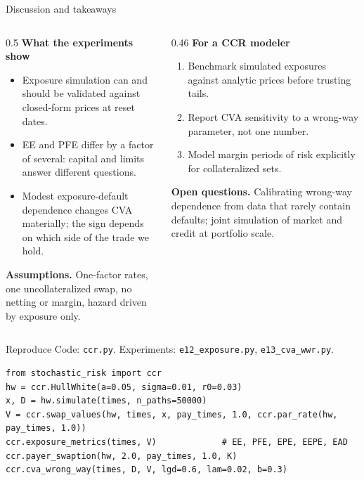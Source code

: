 \documentclass[aspectratio=169,10pt]{beamer}
\begin{document}
\begin{frame}{Discussion and takeaways}
  \small
  \begin{columns}[T]
    \begin{column}{0.5\textwidth}
      \textbf{What the experiments show}
      \begin{itemize}
        \item Exposure simulation can and should be validated against closed-form prices at reset dates.
        \item EE and PFE differ by a factor of several: capital and limits answer different questions.
        \item Modest exposure-default dependence changes CVA materially; the sign depends on which side of the trade we hold.
      \end{itemize}
      \textbf{Assumptions.} One-factor rates, one uncollateralized swap, no netting or margin, hazard driven by exposure only.
    \end{column}
    \begin{column}{0.46\textwidth}
      \textbf{For a CCR modeler}
      \begin{enumerate}
        \item Benchmark simulated exposures against analytic prices before trusting tails.
        \item Report CVA sensitivity to a wrong-way parameter, not one number.
        \item Model margin periods of risk explicitly for collateralized sets.
      \end{enumerate}
      \textbf{Open questions.} Calibrating wrong-way dependence from data that rarely contain defaults; joint simulation of market and credit at portfolio scale.
    \end{column}
  \end{columns}
\end{frame}

\begin{frame}[fragile]{Reproduce}
  \small
  Code: \texttt{ccr.py}. Experiments: \texttt{e12\_exposure.py}, \texttt{e13\_cva\_wwr.py}.
\begin{verbatim}
from stochastic_risk import ccr
hw = ccr.HullWhite(a=0.05, sigma=0.01, r0=0.03)
x, D = hw.simulate(times, n_paths=50000)
V = ccr.swap_values(hw, times, x, pay_times, 1.0, ccr.par_rate(hw, pay_times, 1.0))
ccr.exposure_metrics(times, V)             # EE, PFE, EPE, EEPE, EAD
ccr.payer_swaption(hw, 2.0, pay_times, 1.0, K)
ccr.cva_wrong_way(times, D, V, lgd=0.6, lam=0.02, b=0.3)
\end{verbatim}
\end{frame}

\deckreferences
\end{document}
